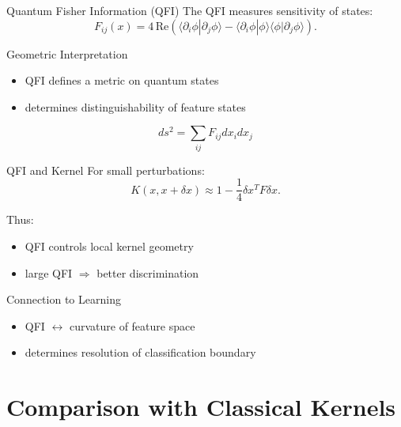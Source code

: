 \documentclass{beamer}
\begin{document}
\begin{frame}{Quantum Fisher Information (QFI)}
The QFI measures sensitivity of states:
\[
F_{ij}(x) = 4\,\mathrm{Re}
\left(
\langle \partial_i \phi | \partial_j \phi \rangle
-
\langle \partial_i \phi | \phi \rangle
\langle \phi | \partial_j \phi \rangle
\right).
\]
\end{frame}


\begin{frame}{Geometric Interpretation}
\begin{itemize}
\item QFI defines a metric on quantum states
\item determines distinguishability of feature states
\end{itemize}

\[
ds^2 = \sum_{ij} F_{ij} dx_i dx_j
\]
\end{frame}


\begin{frame}{QFI and Kernel}
For small perturbations:
\[
K(x,x+\delta x) \approx 1 - \frac{1}{4} \delta x^T F \delta x.
\]

Thus:
\begin{itemize}
\item QFI controls local kernel geometry
\item large QFI $\Rightarrow$ better discrimination
\end{itemize}
\end{frame}


\begin{frame}{Connection to Learning}
\begin{itemize}
\item QFI $\leftrightarrow$ curvature of feature space
\item determines resolution of classification boundary
\end{itemize}
\end{frame}


\section{Comparison with Classical Kernels}
\end{document}
